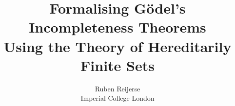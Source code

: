 \documentclass[notitlepage]{report}
\title{Formalising Gödel's Incompleteness Theorems \\[1ex] \large Using the Theory of Hereditarily Finite Sets}
\author{Ruben Reijerse\\Imperial College London}
\begin{document}
\maketitle
\thispagestyle{empty}
\begin{abstract}
    
\end{abstract}

\tableofcontents

\end{document}
